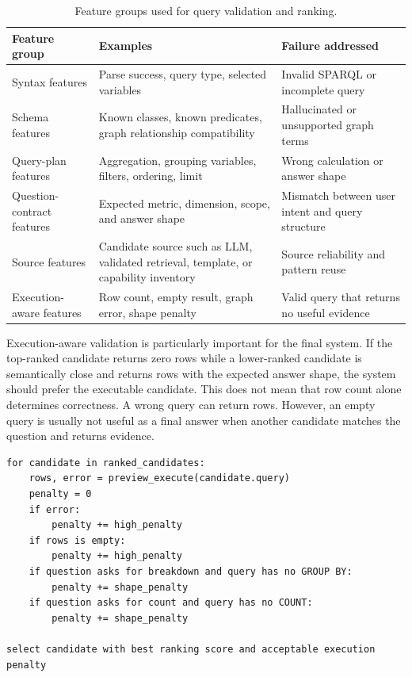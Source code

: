 \begin{table}[ht]
\centering
\caption{Feature groups used for query validation and ranking.}
\label{tab:feature-groups}
\begin{tabular}{p{3.6cm}p{6.2cm}p{3.8cm}}
\hline
\textbf{Feature group} & \textbf{Examples} & \textbf{Failure addressed} \\
\hline
Syntax features & Parse success, query type, selected variables & Invalid SPARQL or incomplete query \\
Schema features & Known classes, known predicates, graph relationship compatibility & Hallucinated or unsupported graph terms \\
Query-plan features & Aggregation, grouping variables, filters, ordering, limit & Wrong calculation or answer shape \\
Question-contract features & Expected metric, dimension, scope, and answer shape & Mismatch between user intent and query structure \\
Source features & Candidate source such as LLM, validated retrieval, template, or capability inventory & Source reliability and pattern reuse \\
Execution-aware features & Row count, empty result, graph error, shape penalty & Valid query that returns no useful evidence \\
\hline
\end{tabular}
\end{table}

Execution-aware validation is particularly important for the final system. If the top-ranked candidate returns zero rows while a lower-ranked candidate is semantically close and returns rows with the expected answer shape, the system should prefer the executable candidate. This does not mean that row count alone determines correctness. A wrong query can return rows. However, an empty query is usually not useful as a final answer when another candidate matches the question and returns evidence.

\begin{lstlisting}[caption={Execution-aware candidate preference.}, label={lst:execution-aware-selection}]
for candidate in ranked_candidates:
    rows, error = preview_execute(candidate.query)
    penalty = 0
    if error:
        penalty += high_penalty
    if rows is empty:
        penalty += high_penalty
    if question asks for breakdown and query has no GROUP BY:
        penalty += shape_penalty
    if question asks for count and query has no COUNT:
        penalty += shape_penalty

select candidate with best ranking score and acceptable execution penalty
\end{lstlisting}

